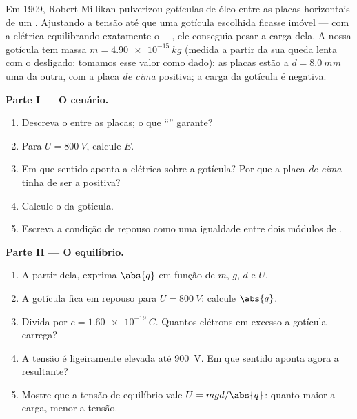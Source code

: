 \begin{problem}
\label{pb:g11:electric-gravitational-fields:1}
Em 1909, Robert Millikan pulverizou gotículas de óleo entre as placas
horizontais de um . Ajustando a tensão até que uma gotícula
escolhida ficasse imóvel --- com a  elétrica equilibrando
exatamente o  ---, ele conseguia pesar a carga dela. A nossa gotícula
tem massa $m = \qty{4.90e-15}{kg}$ (medida a partir da sua queda lenta
com o  desligado; tomamos esse valor como dado); as placas estão a
$d = \qty{8.0}{mm}$ uma da outra, com a placa \emph{de cima} positiva; a
carga da gotícula é negativa.

\medskip
\noindent\textbf{Parte I --- O cenário.}
\begin{enumerate}
  \item Descreva o  entre as placas; o que ``'' garante?
  \item Para $U = \qty{800}{V}$, calcule $E$.
  \item Em que sentido aponta a  elétrica sobre a gotícula? Por que a
        placa \emph{de cima} tinha de ser a positiva?
  \item Calcule o  da gotícula.
  \item Escreva a condição de repouso como uma igualdade entre dois
        módulos de .
\end{enumerate}

\medskip
\noindent\textbf{Parte II --- O equilíbrio.}
\begin{enumerate}[resume]
  \item A partir dela, exprima $\abs{q}$ em função de $m$, $g$, $d$ e $U$.
  \item A gotícula fica em repouso para $U = \qty{800}{V}$: calcule
        $\abs{q}$.
  \item Divida por $e = \qty{1.60e-19}{C}$. Quantos elétrons em excesso a
        gotícula carrega?
  \item A tensão é ligeiramente elevada até \qty{900}{V}. Em que sentido
        aponta agora a  resultante?
  \item Mostre que a tensão de equilíbrio vale $U = mgd/\abs{q}$: quanto
        maior a carga, menor a tensão.
\end{enumerate}


\end{problem}
